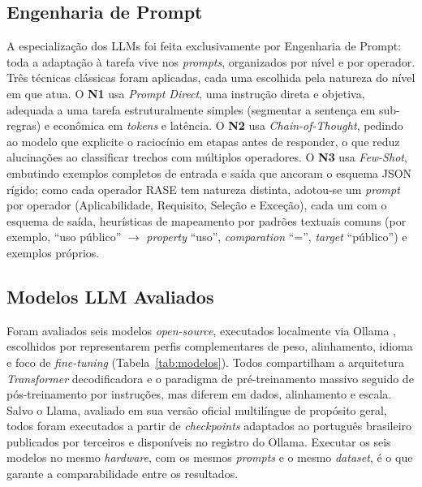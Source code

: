 \documentclass[a4paper,fleqn]{cas-sc}
\begin{document}
\subsection{Engenharia de Prompt}\label{sec:engenharia-prompt}
A especialização dos LLMs foi feita exclusivamente por Engenharia de Prompt: toda a adaptação à tarefa vive nos \textit{prompts}, organizados por nível e por operador. Três técnicas clássicas foram aplicadas, cada uma escolhida pela natureza do nível em que atua. O \textbf{N1} usa \textit{Prompt Direct}, uma instrução direta e objetiva, adequada a uma tarefa estruturalmente simples (segmentar a sentença em sub-regras) e econômica em \textit{tokens} e latência. O \textbf{N2} usa \textit{Chain-of-Thought}, pedindo ao modelo que explicite o raciocínio em etapas antes de responder, o que reduz alucinações ao classificar trechos com múltiplos operadores. O \textbf{N3} usa \textit{Few-Shot}, embutindo exemplos completos de entrada e saída que ancoram o esquema JSON rígido; como cada operador RASE tem natureza distinta, adotou-se um \textit{prompt} por operador (Aplicabilidade, Requisito, Seleção e Exceção), cada um com o esquema de saída, heurísticas de mapeamento por padrões textuais comuns (por exemplo, ``uso público'' $\rightarrow$ \textit{property} ``uso'', \textit{comparation} ``='', \textit{target} ``público'') e exemplos próprios.

\subsection{Modelos LLM Avaliados}\label{sec:modelos}
Foram avaliados seis modelos \textit{open-source}, executados localmente via Ollama \citep{ollama2024}, escolhidos por representarem perfis complementares de peso, alinhamento, idioma e foco de \textit{fine-tuning} (Tabela~\ref{tab:modelos}). Todos compartilham a arquitetura \textit{Transformer} decodificadora e o paradigma de pré-treinamento massivo seguido de pós-treinamento por instruções, mas diferem em dados, alinhamento e escala. Salvo o Llama, avaliado em sua versão oficial multilíngue de propósito geral, todos foram executados a partir de \textit{checkpoints} adaptados ao português brasileiro publicados por terceiros e disponíveis no registro do Ollama. Executar os seis modelos no mesmo \textit{hardware}, com os mesmos \textit{prompts} e o mesmo \textit{dataset}, é o que garante a comparabilidade entre os resultados.
\end{document}
